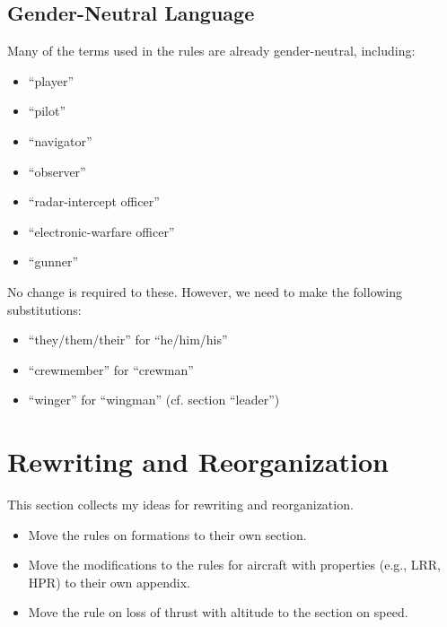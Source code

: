 \documentclass[10pt]{article}
\begin{document}
\begin{itemize}
\end{itemize}


\subsection*{Gender-Neutral Language}
 
Many of the terms used in the rules are already gender-neutral, including:
\begin{itemize}
    \item “player”
    \item “pilot”
    \item “navigator”
    \item “observer”
    \item “radar-intercept officer”
    \item “electronic-warfare officer”
    \item “gunner”
\end{itemize}
No change is required to these. However, we need to make the following substitutions: 
\begin{itemize}
    \item “they/them/their” for “he/him/his”
    \item “crewmember” for “crewman”
    \item “winger” for “wingman” (cf. section “leader”)
\end{itemize}

\section*{Rewriting and Reorganization}

This section collects my ideas for rewriting and reorganization.

\begin{itemize}
    \item Move the rules on formations to their own section.
    \item Move the modifications to the rules for aircraft with properties (e.g., LRR, HPR) to their own appendix.
    \item Move the rule on loss of thrust with altitude to the section on speed.
\end{itemize}
\end{document}
